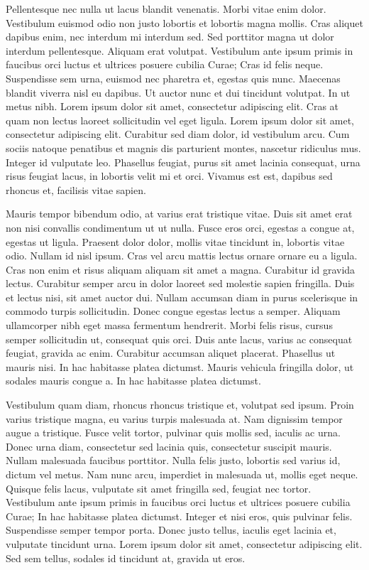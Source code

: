 Pellentesque nec nulla ut lacus blandit venenatis. Morbi vitae enim dolor.
Vestibulum euismod odio non justo lobortis et lobortis magna mollis. Cras
aliquet dapibus enim, nec interdum mi interdum sed. Sed porttitor magna ut dolor
interdum pellentesque. Aliquam erat volutpat. Vestibulum ante ipsum primis in
faucibus orci luctus et ultrices posuere cubilia Curae; Cras id felis neque.
Suspendisse sem urna, euismod nec pharetra et, egestas quis nunc. Maecenas
blandit viverra nisl eu dapibus. Ut auctor nunc et dui tincidunt volutpat. In ut
metus nibh. Lorem ipsum dolor sit amet, consectetur adipiscing elit. Cras at
quam non lectus laoreet sollicitudin vel eget ligula. Lorem ipsum dolor sit
amet, consectetur adipiscing elit. Curabitur sed diam dolor, id vestibulum arcu.
Cum sociis natoque penatibus et magnis dis parturient montes, nascetur ridiculus
mus. Integer id vulputate leo. Phasellus feugiat, purus sit amet lacinia
consequat, urna risus feugiat lacus, in lobortis velit mi et orci. Vivamus est
est, dapibus sed rhoncus et, facilisis vitae sapien.

Mauris tempor bibendum odio, at varius erat tristique vitae. Duis sit amet erat
non nisi convallis condimentum ut ut nulla. Fusce eros orci, egestas a congue
at, egestas ut ligula. Praesent dolor dolor, mollis vitae tincidunt in, lobortis
vitae odio. Nullam id nisl ipsum. Cras vel arcu mattis lectus ornare ornare eu a
ligula. Cras non enim et risus aliquam aliquam sit amet a magna. Curabitur id
gravida lectus. Curabitur semper arcu in dolor laoreet sed molestie sapien
fringilla. Duis et lectus nisi, sit amet auctor dui. Nullam accumsan diam in
purus scelerisque in commodo turpis sollicitudin. Donec congue egestas lectus a
semper. Aliquam ullamcorper nibh eget massa fermentum hendrerit. Morbi felis
risus, cursus semper sollicitudin ut, consequat quis orci. Duis ante lacus,
varius ac consequat feugiat, gravida ac enim. Curabitur accumsan aliquet
placerat. Phasellus ut mauris nisi. In hac habitasse platea dictumst. Mauris
vehicula fringilla dolor, ut sodales mauris congue a. In hac habitasse platea
dictumst.

Vestibulum quam diam, rhoncus rhoncus tristique et, volutpat sed ipsum. Proin
varius tristique magna, eu varius turpis malesuada at. Nam dignissim tempor
augue a tristique. Fusce velit tortor, pulvinar quis mollis sed, iaculis ac
urna. Donec urna diam, consectetur sed lacinia quis, consectetur suscipit
mauris. Nullam malesuada faucibus porttitor. Nulla felis justo, lobortis sed
varius id, dictum vel metus. Nam nunc arcu, imperdiet in malesuada ut, mollis
eget neque. Quisque felis lacus, vulputate sit amet fringilla sed, feugiat nec
tortor. Vestibulum ante ipsum primis in faucibus orci luctus et ultrices posuere
cubilia Curae; In hac habitasse platea dictumst. Integer et nisi eros, quis
pulvinar felis. Suspendisse semper tempor porta. Donec justo tellus, iaculis
eget lacinia et, vulputate tincidunt urna. Lorem ipsum dolor sit amet,
consectetur adipiscing elit. Sed sem tellus, sodales id tincidunt at, gravida ut
eros.

